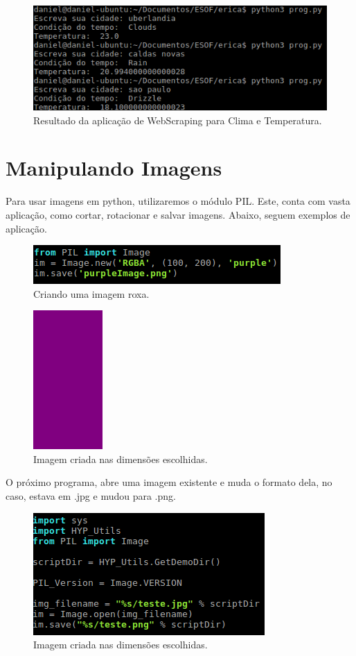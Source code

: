 \documentclass[12pt, a4paper, twocolumn]{article}
\begin{document}
\begin{figure}[htb!]
	\centering
	\includegraphics[scale = 0.45]{resultadoserica.png}
	\caption{Resultado da aplicação de WebScraping para Clima e Temperatura.}
\end{figure}

\section{Manipulando Imagens}
Para usar imagens em python, utilizaremos o módulo PIL. Este, conta com vasta aplicação, como cortar, rotacionar e salvar imagens. Abaixo, seguem exemplos de aplicação.
\begin{figure}[htb!]
	\centering
	\includegraphics[scale = 0.55]{roxo.png}
	\caption{Criando uma imagem roxa.}
\end{figure}
\begin{figure}[htb!]
	\centering
	\includegraphics[scale = 0.55]{purpleImage.png}
	\caption{Imagem criada nas dimensões escolhidas.}
\end{figure}

O próximo programa, abre uma imagem existente e muda o formato dela, no caso, estava em .jpg e mudou para .png.

\begin{figure}[htb!]
	\centering
	\includegraphics[scale = 0.60]{troca.png}
	\caption{Imagem criada nas dimensões escolhidas.}
\end{figure}
\end{document}
